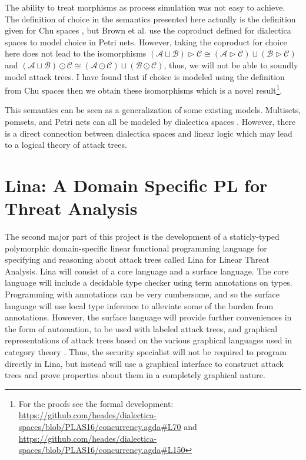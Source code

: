 \documentclass{sigplanconf}
\newcommand{\cat}[1]{\mathcal{#1}}
\begin{document}
The ability to treat morphisms as process simulation was not easy to
achieve.  The definition of choice in the semantics presented here
actually is the definition given for Chu spaces \cite{Gupta:1994}, but
Brown et al. use the coproduct defined for dialectica spaces to model
choice in Petri nets.  However, taking the coproduct for choice here
does not lead to the isomorphisms $(\cat{A} \sqcup \cat{B}) \rhd
\cat{C} \cong (\cat{A} \rhd \cat{C}) \sqcup (\cat{B} \rhd \cat{C})$
and $(\cat{A} \sqcup \cat{B}) \odot \cat{C} \cong (\cat{A} \odot
\cat{C}) \sqcup (\cat{B} \odot \cat{C})$, thus, we will not be able to
soundly model attack trees.  I have found that if choice is modeled
using the definition from Chu spaces \cite{Gupta:1994} then we obtain
these isomorphisms which is a novel result\footnote{For the proofs see
  the formal development:
  \url{https://github.com/heades/dialectica-spaces/blob/PLAS16/concurrency.agda\#L70}
  and
  \url{https://github.com/heades/dialectica-spaces/blob/PLAS16/concurrency.agda\#L150}}.

This semantics can be seen as a generalization of some existing
models.  Multisets, pomsets, and Petri nets can all be modeled by
dialectica spaces \cite{Brown:1991,Gupta:1994}.  However, there is a
direct connection between dialectica spaces and linear logic which
may lead to a logical theory of attack trees.

\section{Lina: A Domain Specific PL for Threat Analysis}
\label{sec:lina:_a_domain_specific_pl_for_threat_analysis}

The second major part of this project is the development of a
staticly-typed polymorphic domain-specific linear functional
programming language for specifying and reasoning about attack trees
called Lina for Linear Threat Analysis.  Lina will consist of a core
language and a surface language.  The core language will include a
decidable type checker using term annotations on types.  Programming
with annotations can be very cumbersome, and so the surface language
will use local type inference \cite{Pierce:2000} to alleviate some of
the burden from annotations.  However, the surface language will
provide further conveniences in the form of automation, to be used
with labeled attack trees, and graphical representations of attack
trees based on the various graphical languages used in category theory
\cite{Selinger:2009}.  Thus, the security specialist will not be
required to program directly in Lina, but instead will use a graphical
interface to construct attack trees and prove properties about them in
a completely graphical nature.  
\end{document}
